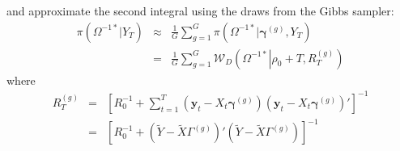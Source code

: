 \documentclass[12pt]{article}
\begin{document}
and approximate the second integral using the draws from the Gibbs sampler:
\begin{eqnarray*}
	\pi\left( \Omega^{-1*}|Y_T \right) &\approx& \frac{1}{G}\sum_{g=1}^G \pi\left( \Omega^{-1*}|\boldsymbol{\gamma}^{(g)},Y_T \right)\\
	&=& \frac{1}{G}\sum_{g=1}^G \mathcal{W}_D\left(\Omega^{-1*}\left|\rho_0 + T, R_T^{\left( g \right)}\right. \right) 
\end{eqnarray*}
where
\begin{eqnarray*}
	R_T^{(g)} &=&  \left[ R_0^{-1} + \sum_{t=1}^{T} \left( \mathbf{y}_t - X_t \boldsymbol{\gamma}^{(g)} \right)\left( \mathbf{y}_t - X_t \boldsymbol{\gamma}^{(g)} \right)' \right]^{-1}\\
	&=& \left[  R_0^{-1} + \left( \widetilde{Y} - \widetilde{X} \Gamma^{(g)} \right)'\left( \widetilde{Y} - \widetilde{X} \Gamma^{(g)} \right)\right]^{-1}
\end{eqnarray*}
\end{document}
